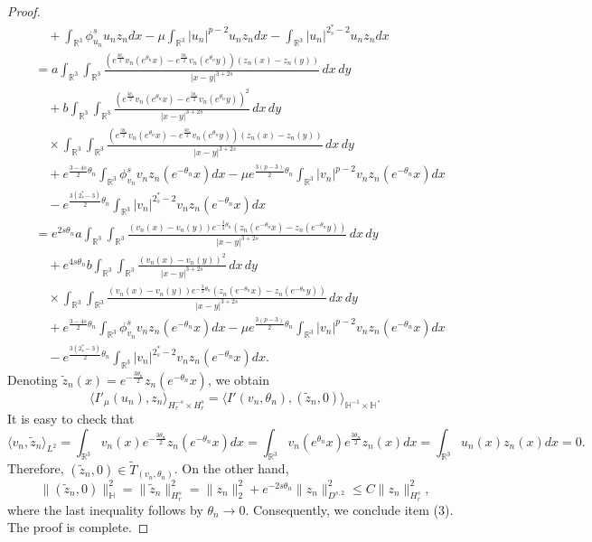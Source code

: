 \begin{proof}
\begin{align*}
&\quad +\int_{\mathbb{R}^3}\phi^s_{u_n}{u_n}z_ndx
 -\mu\int_{\mathbb{R}^3}|u_n|^{p-2}u_n z_ndx-\int_{\mathbb{R}^3}|u_n|^{2^*_s-2}u_n z_ndx\\
&=  a\int_{\mathbb{R}^3}\int_{\mathbb{R}^3}\frac{(e^{\frac{3\theta_n}{2}}
 v_n(e^{\theta_n} x)-e^{\frac{3\theta_n}{2}}v_n(e^{\theta_n} y))(z_n(x)
 -z_n(y))}{|x-y|^{3+2s}}\,dx\,dy\\
&\quad +b\int_{\mathbb{R}^3}\int_{\mathbb{R}^3}
 \frac{(e^{\frac{3\theta_n}{2}}v_n(e^{\theta_n} x)-e^{\frac{3\theta_n}{2}}
 v_n(e^{\theta_n} y))^2}{|x-y|^{3+2s}}\,dx\,dy \\
 &\quad\times \int_{\mathbb{R}^3}
 \int_{\mathbb{R}^3}\frac{(e^{\frac{3\theta_n}{2}}v_n(e^{\theta_n } x)
 -e^{\frac{3\theta_n}{2}}v_n(e^{\theta_n} y))(z_n(x)-z_n(y))}{|x-y|^{3+2s}}\,dx\,dy\\
&\quad +e^{\frac{3-4s}{2}\theta_n}\int_{\mathbb{R}^3}\phi^s_{v_n}{v_n}
 z_n(e^{-\theta_n}x)dx-\mu e^{\frac{3(p-3)}{2}\theta_n}\int_{\mathbb{R}^3}
 |v_n|^{p-2}v_n z_n(e^{-\theta_n}x) dx\\
&\quad -e^{\frac{3(2^*_s-3)}{2}\theta_n}\int_{\mathbb{R}^3}|v_n|^{2^*_s-2}
 v_n z_n(e^{-\theta_n}x) dx\\
&= e^{2s\theta_n}a\int_{\mathbb{R}^3}\int_{\mathbb{R}^3}\frac{(v_n(x)-v_n(y))
 e^{-\frac{3}{2}\theta_n}(z_n(e^{-\theta_n} x)-z_n(e^{-\theta_n}y))}
  {|x-y|^{3+2s}}\,dx\,dy\\
&\quad +e^{4s\theta_n}b\int_{\mathbb{R}^3}\int_{\mathbb{R}^3}
 \frac{(v_n( x)-v_n( y))^2}{|x-y|^{3+2s}}\,dx\,dy \\
 &\quad\times  \int_{\mathbb{R}^3}\int_{\mathbb{R}^3}\frac{(v_n( x)-v_n( y))
 e^{-\frac{3}{2}\theta_n}(z_n(e^{-\theta_n} x)
 -z_n(e^{-\theta_n}y))}{|x-y|^{3+2s}}\,dx\,dy  \\
&\quad +e^{\frac{3-4s}{2}\theta_n}\int_{\mathbb{R}^3}\phi^s_{v_n}{v_n}z_n
 (e^{-\theta_n}x)dx-\mu e^{\frac{3(p-3)}{2}\theta_n}
 \int_{\mathbb{R}^3}|v_n|^{p-2}v_n z_n(e^{-\theta_n}x) dx\\
&\quad -e^{\frac{3(2^*_s-3)}{2}\theta_n}\int_{\mathbb{R}^3}|v_n|^{2^*_s-2}
v_n z_n(e^{-\theta_n}x) dx.
\end{align*}
Denoting $\tilde{z}_n(x)=e^{-\frac{3\theta_n}{2}}z_n(e^{-\theta_n}x)$,
 we obtain
$$
\langle I'_\mu(u_n),z_n\rangle_{{H^{-s}_r}\times H^s_r}
=\langle I'(v_n, \theta_n), (\tilde{z}_n, 0) \rangle_{\mathbb{H}^{-1}\times \mathbb{H}}.
$$
It is easy to check that
\[  %
 \langle v_n, \tilde{z}_n\rangle_{L^2}=\int_{\mathbb{R}^3} v_n(x) e^{-\frac{3\theta_n}{2}}z_n(e^{-\theta_n}x)dx
 =\int_{\mathbb{R}^3} v_n(e^{\theta_n}x) e^{\frac{3\theta_n}{2}}z_n(x)dx
 =\int_{\mathbb{R}^3}u_n(x)z_n(x)dx=0.
\]
Therefore, $(\tilde{z}_n, 0)\in \tilde{T}_{(v_n, \theta_n)}$.
On the other hand,
$$
\|(\tilde{z}_n,0)\|^2_{\mathbb{H}}=\|\tilde{z}_n\|^2_{{H^s_r}}=\|z_n\|^2_2
+e^{-2s\theta_n}\|z_n\|^2_{D^{s,2}}\leq C\|z_n\|^2_{H^s_r},
$$
where the last inequality follows by $\theta_n\to 0$. Consequently, we conclude
item (3). The proof is complete.
\end{proof}


